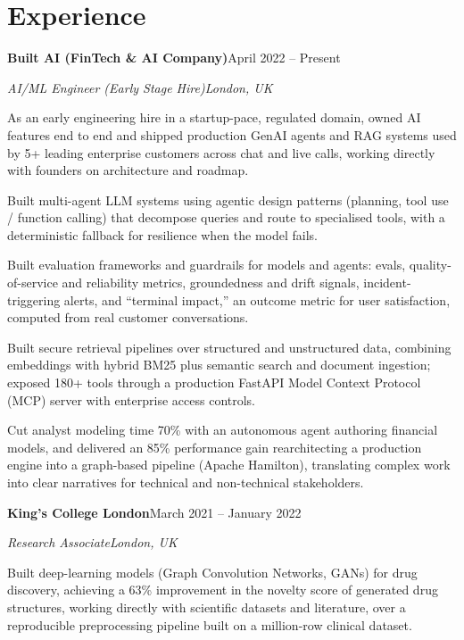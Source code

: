\documentclass[10pt,a4paper]{article}
\newcommand{\entry}[4]{%
  {\color{company}\bfseries #1}\hfill {\color{muted}#2}\par
  \vspace{1pt}
  {\itshape #3}\hfill {\color{muted}\itshape #4}\par
  \vspace{3pt}%
}
\begin{document}
\section{Experience}
\entry{Built AI (FinTech \& AI Company)}{April 2022 -- Present}{AI/ML Engineer (Early Stage Hire)}{London, UK}
\begin{tight}
  \item As an early engineering hire in a startup-pace, regulated domain, owned AI features end to end and shipped production GenAI agents and RAG systems used by 5+ leading enterprise customers across chat and live calls, working directly with founders on architecture and roadmap.
  \item Built multi-agent LLM systems using agentic design patterns (planning, tool use / function calling) that decompose queries and route to specialised tools, with a deterministic fallback for resilience when the model fails.
  \item Built evaluation frameworks and guardrails for models and agents: evals, quality-of-service and reliability metrics, groundedness and drift signals, incident-triggering alerts, and ``terminal impact,'' an outcome metric for user satisfaction, computed from real customer conversations.
  \item Built secure retrieval pipelines over structured and unstructured data, combining embeddings with hybrid BM25 plus semantic search and document ingestion; exposed 180+ tools through a production FastAPI Model Context Protocol (MCP) server with enterprise access controls.
  \item Cut analyst modeling time 70\% with an autonomous agent authoring financial models, and delivered an 85\% performance gain rearchitecting a production engine into a graph-based pipeline (Apache Hamilton), translating complex work into clear narratives for technical and non-technical stakeholders.
\end{tight}

\entry{King's College London}{March 2021 -- January 2022}{Research Associate}{London, UK}
\begin{tight}
  \item Built deep-learning models (Graph Convolution Networks, GANs) for drug discovery, achieving a 63\% improvement in the novelty score of generated drug structures, working directly with scientific datasets and literature, over a reproducible preprocessing pipeline built on a million-row clinical dataset.
\end{tight}
\end{document}

